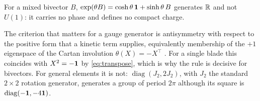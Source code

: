 \begin{corollary}
\label{cor:noboost}
For a mixed bivector $B$, $\exp(\theta B)=\cosh\theta\,\mathbf 1+\sinh\theta\,B$ generates $\mathbb{R}$ and not $U(1)$: it carries no
phase and defines no compact charge.
\end{corollary}

The criterion that matters for a gauge generator is antisymmetry with respect to the positive form that a kinetic term
supplies, equivalently membership of the $+1$ eigenspace of the Cartan involution $\theta(X)=-X^{\!\top}$
\cite{Knapp,Helgason}. For a single blade this coincides with $X^2=-\mathbf 1$ by \eqref{eq:transpose}, which is why the rule is
decisive for bivectors. For general elements it is not: $\operatorname{diag}(J_2,2J_2)$, with $J_2$ the standard $2\times2$
rotation generator, generates a group of period $2\pi$ although its square is $\operatorname{diag}(-\mathbf 1,-4\mathbf 1)$.

